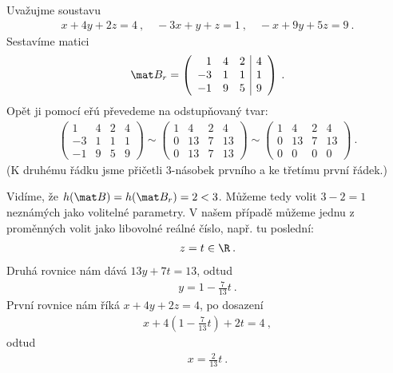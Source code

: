 \begin{example}
    Uvažujme soustavu \begin{align}
        x + 4y + 2z = 4 \:, \quad -3x+y+z=1 \:, \quad -x + 9y + 5z = 9 \:.
    \end{align}
    Sestavíme matici
    \begin{align}
       \mat B_r = \left( \begin{array}{rrr|r}
        1 & 4 & 2 & 4 \\ -3 & 1 & 1 & 1 \\ -1 & 9 & 5 & 9
    \end{array}\right) \:.
    \end{align}
    Opět ji pomocí eřú převedeme na odstupňovaný tvar:
    \begin{align}
        \left( \begin{array}{rrr|r}
            1 & 4 & 2 & 4 \\ -3 & 1 & 1 & 1 \\ -1 & 9 & 5 & 9
        \end{array}\right)
        \sim
        \left( \begin{array}{rrr|r}
            1 & 4 & 2 & 4 \\ 0 & 13 & 7 & 13 \\ 0 & 13 & 7 & 13
        \end{array}\right)
        \sim
        \left( \begin{array}{rrr|r}
        1 & 4 & 2 & 4 \\ 0 & 13 & 7 & 13 \\ 0 & 0 & 0 & 0
        \end{array}\right) \:.
    \end{align}
    (K druhému řádku jsme přičetli $3$-násobek prvního a ke třetímu první řádek.)

    Vidíme, že $h(\mat B) = h(\mat B_r) = 2 < 3$. Můžeme tedy volit $3-2 =1$ neznámých jako volitelné parametry. V našem případě můžeme jednu z proměnných volit jako libovolné reálné číslo, např. tu poslední:
    \begin{align}
        z = t \in \R \:.
    \end{align}
    Druhá rovnice nám dává $13y + 7t = 13$, odtud
    \begin{align}
        y = 1 - \frac{7}{13} t \:.
    \end{align}
    První rovnice nám říká $x + 4y + 2z = 4$, po dosazení \begin{align}
        x + 4 \left( 1 - \frac{7}{13} t \right) + 2t = 4 \:, 
    \end{align}
    odtud
    \begin{align}
        x = \frac{2}{13} t \:.
    \end{align}


\end{example}
